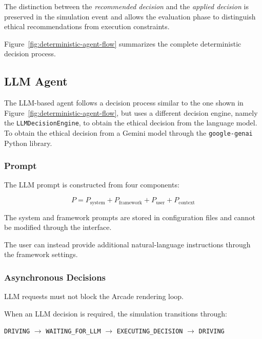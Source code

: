 \documentclass[10pt,a4paper]{article}
\begin{document}
The distinction between the \emph{recommended decision} and the
\emph{applied decision} is preserved in the simulation event and allows
the evaluation phase to distinguish ethical recommendations from
execution constraints.

Figure~\ref{fig:deterministic-agent-flow} summarizes the complete
deterministic decision process.


\subsection{LLM Agent}

The LLM-based agent follows a decision process similar to the one shown in Figure~\ref{fig:deterministic-agent-flow}, but uses a different decision engine, namely the \texttt{LLMDecisionEngine}, to obtain the ethical decision from the language model.
To obtain the ethical decision from a Gemini model through the \texttt{google-genai} Python library.


\subsubsection{Prompt}

The LLM prompt is constructed from four components:

\begin{equation}
P =
P_{\text{system}}
+
P_{\text{framework}}
+
P_{\text{user}}
+
P_{\text{context}}
\end{equation}

The system and framework prompts are stored in configuration files and
cannot be modified through the interface.

The user can instead provide additional natural-language instructions
through the framework settings.


\subsubsection{Asynchronous Decisions}

LLM requests must not block the Arcade rendering loop.

When an LLM decision is required, the simulation transitions through:

\begin{center}
\texttt{DRIVING}
$\rightarrow$
\texttt{WAITING\_FOR\_LLM}
$\rightarrow$
\texttt{EXECUTING\_DECISION}
$\rightarrow$
\texttt{DRIVING}
\end{center}
\end{document}
